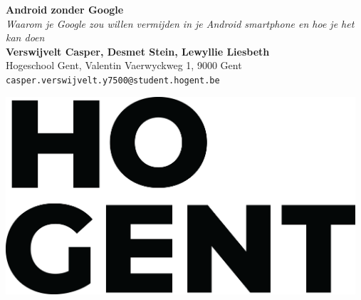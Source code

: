 \documentclass[a0,portrait]{a0poster}
\begin{document}


\begin{minipage}[t]{0.75\linewidth}
\VeryHuge \color{HoGentAccent1} \textbf{Android zonder Google} \color{Black}\\ %
\Huge\textit{Waarom je Google zou willen vermijden in je Android smartphone en hoe je het kan doen}\\[2.4cm] %
\huge \textbf{Verswijvelt Casper, Desmet Stein, Lewyllie Liesbeth}\\[0.5cm] %
\huge Hogeschool Gent, Valentin Vaerwyckweg 1, 9000 Gent\\[0.4cm] %
\Large \texttt{casper.verswijvelt.y7500@student.hogent.be} \\
\end{minipage}
%
\begin{minipage}[t]{0.25\linewidth}
\includegraphics[width=13cm,right]{figures/HOGENT_Logo_Pos_rgb.png} 

\end{minipage}

\vspace{1cm} %

\end{document}
